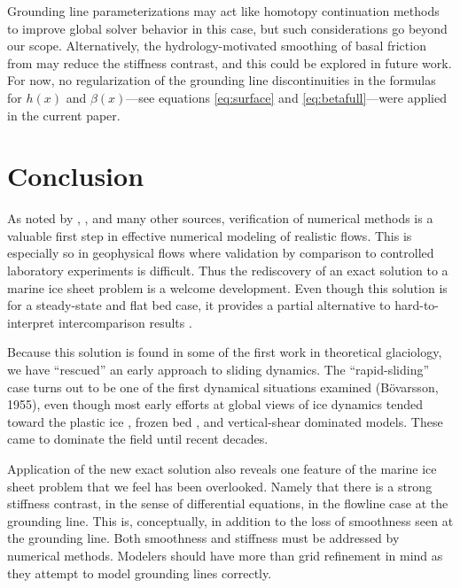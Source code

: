 \documentclass[review,letterpaper]{igs}
\renewcommand{\dh}{\fontencoding{T1}\selectfont{\symbol{240}}}
\newcommand{\citepbod}{(B\"o\dh varsson, 1955)\nocite{Bodvardsson}}
\begin{document}
Grounding line parameterizations \citep[e.g.][]{Gladstoneetal2010,Feldmannetal2014} may act like homotopy continuation methods \citep{Kelley} to improve global solver behavior in this case, but such considerations go beyond our scope.  Alternatively, the hydrology-motivated smoothing of basal friction from \cite{Leguyetal2014TCD} may reduce the stiffness contrast, and this could be explored in future work.  For now, no regularization of the grounding line discontinuities in the formulas for $h(x)$ and $\beta(x)$---see equations \eqref{eq:surface} and \eqref{eq:betafull}---were applied in the current paper.  


\section{Conclusion}  As noted by \cite{BLKCB}, \cite{Wesseling}, and many other sources, verification of numerical methods is a valuable first step in effective numerical modeling of realistic flows.  This is especially so in geophysical flows where validation by comparison to controlled laboratory experiments is difficult.  Thus the rediscovery of an exact solution to a marine ice sheet problem is a welcome development.  Even though this solution is for a steady-state and flat bed case, it provides a partial alternative to hard-to-interpret intercomparison results \citep{MISMIP2012}.

Because this solution is found in some of the first work in theoretical glaciology, we have ``rescued'' an early approach to sliding dynamics.  The ``rapid-sliding'' case turns out to be one of the first dynamical situations examined \citepbod, even though most early efforts at global views of ice dynamics tended toward the plastic ice \citep{Orowan,Nye52plastic}, frozen bed \citep{Vialov}, and vertical-shear dominated \citep{Weertman61stability} models.  These came to dominate the field until recent decades.

Application of the new exact solution also reveals one feature of the marine ice sheet problem that we feel has been overlooked.  Namely that there is a strong stiffness contrast, in the sense of differential equations, in the flowline case at the grounding line.  This is, conceptually, in addition to the loss of smoothness seen at the grounding line.  Both smoothness and stiffness must be addressed by numerical methods.  Modelers should have more than grid refinement in mind as they attempt to model grounding lines correctly.
\end{document}
